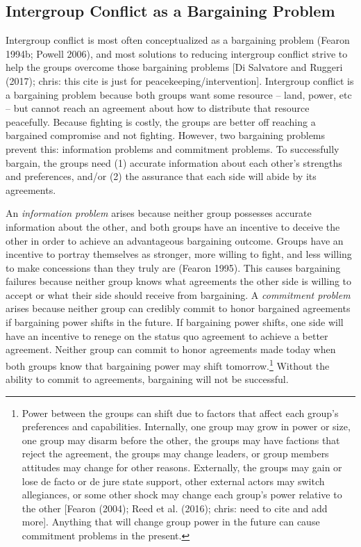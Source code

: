 \documentclass[11pt]{article}
\begin{document}
\hypertarget{intergroup-conflict-as-a-bargaining-problem}{%
\subsection{Intergroup Conflict as a Bargaining
Problem}\label{intergroup-conflict-as-a-bargaining-problem}}

Intergroup conflict is most often conceptualized as a bargaining problem
(Fearon 1994b; Powell 2006), and most solutions to reducing intergroup
conflict strive to help the groups overcome those bargaining problems
{[}Di Salvatore and Ruggeri (2017); chris: this cite is just for
peacekeeping/intervention{]}. Intergroup conflict is a bargaining
problem because both groups want some resource -- land, power, etc --
but cannot reach an agreement about how to distribute that resource
peacefully. Because fighting is costly, the groups are better off
reaching a bargained compromise and not fighting. However, two
bargaining problems prevent this: information problems and commitment
problems. To successfully bargain, the groups need (1) accurate
information about each other's strengths and preferences, and/or (2) the
assurance that each side will abide by its agreements.

An \emph{information problem} arises because neither group possesses
accurate information about the other, and both groups have an incentive
to deceive the other in order to achieve an advantageous bargaining
outcome. Groups have an incentive to portray themselves as stronger,
more willing to fight, and less willing to make concessions than they
truly are (Fearon 1995). This causes bargaining failures because neither
group knows what agreements the other side is willing to accept or what
their side should receive from bargaining. A \emph{commitment problem}
arises because neither group can credibly commit to honor bargained
agreements if bargaining power shifts in the future. If bargaining power
shifts, one side will have an incentive to renege on the status quo
agreement to achieve a better agreement. Neither group can commit to
honor agreements made today when both groups know that bargaining power
may shift tomorrow.\footnote{Power between the groups can shift due to
  factors that affect each group's preferences and capabilities.
  Internally, one group may grow in power or size, one group may disarm
  before the other, the groups may have factions that reject the
  agreement, the groups may change leaders, or group members attitudes
  may change for other reasons. Externally, the groups may gain or lose
  de facto or de jure state support, other external actors may switch
  allegiances, or some other shock may change each group's power
  relative to the other {[}Fearon (2004); Reed et al. (2016); chris:
  need to cite and add more{]}. Anything that will change group power in
  the future can cause commitment problems in the present.} Without the
ability to commit to agreements, bargaining will not be successful.
\end{document}
